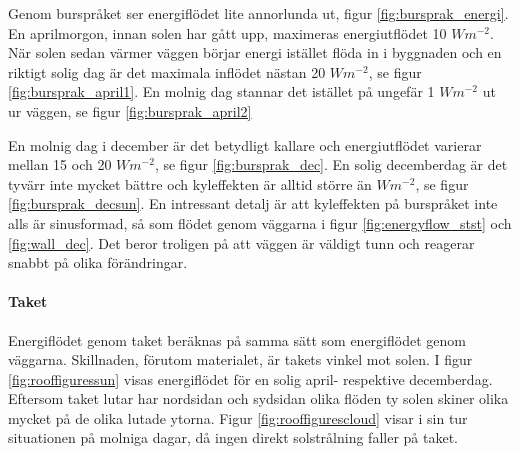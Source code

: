 Genom burspråket ser energiflödet lite annorlunda ut, figur \ref{fig:bursprak_energi}. En aprilmorgon, innan solen har gått upp, maximeras energiutflödet 10 $\unit{W m^{-2}}$. När solen sedan värmer väggen börjar energi istället flöda in i byggnaden och en riktigt solig dag är det maximala inflödet nästan 20 $\unit{W m^{-2}}$, se figur \ref{fig:bursprak_april1}. En molnig dag stannar det istället på ungefär 1 $\unit{W m^{-2}}$ ut ur väggen, se figur \ref{fig:bursprak_april2}

 En molnig dag  i december är det betydligt kallare och energiutflödet varierar mellan 15 och 20 $\unit{W m^{-2}}$, se figur \ref{fig:bursprak_dec}. En solig decemberdag är det tyvärr inte mycket bättre och kyleffekten är alltid större än $\unit{W m^{-2}}$, se figur \ref{fig:bursprak_decsun}.
 En intressant detalj är att kyleffekten på burspråket inte alls är sinusformad, så som flödet genom väggarna i figur \ref{fig:energyflow_stst} och \ref{fig:wall_dec}. Det beror troligen på att väggen är väldigt tunn och reagerar snabbt på olika förändringar.

\paragraph{Taket}

Energiflödet genom taket beräknas på samma sätt som energiflödet genom väggarna. Skillnaden, förutom materialet, är takets vinkel mot solen. I figur \ref{fig:rooffiguressun} visas energiflödet för en solig april- respektive decemberdag. Eftersom taket lutar har nordsidan och sydsidan olika flöden ty solen skiner olika mycket på de olika lutade ytorna. Figur \ref{fig:rooffigurescloud} visar i sin tur situationen på molniga dagar, då ingen direkt solstrålning faller på taket.

